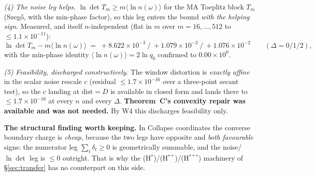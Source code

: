 \documentclass[11pt]{article}
\theoremstyle{definition}
\theoremstyle{remark}
\begin{document}
\emph{(4) The noise leg helps.} $\ln\det T_m\ge m\langle\ln n(\omega)\rangle$
for the MA Toeplitz block $T_m$ (Szeg\H o, with the min-phase factor), so this
leg enters the bound \emph{with the helping sign}. Measured, and itself
$n$-independent (flat in $m$ over $m=16,\dots,512$ to
$\le1.1\times10^{-11}$):
\[
\ln\det T_m-m\langle\ln n(\omega)\rangle
\;=\;+8.622\times10^{-3}\ /\ +1.079\times10^{-2}\ /\ +1.076\times10^{-2}
\qquad(\Delta=0/1/2),
\]
with the min-phase identity $\langle\ln n(\omega)\rangle=2\ln q_0$ confirmed
to $0.00\times10^{0}$.

\emph{(5) Feasibility, discharged constructively.} The window distortion is
\emph{exactly affine} in the scalar noise rescale $c$ (residual
$\le1.7\times10^{-16}$ over a three-point secant test), so the $c$ landing at
$\mathrm{dist}=D$ is available in closed form and lands there to
$\le1.7\times10^{-16}$ at every $n$ and every $\Delta$. \textbf{Theorem~C's
convexity repair was available and was not needed.} By W4 this discharges
feasibility only.

\medskip\noindent\textbf{The structural finding worth keeping.} In Collapse
coordinates the converse boundary charge is \emph{cheap}, because the two legs
have opposite and \emph{both favourable} signs: the numerator leg
$\sum_t\delta_t\ge0$ is geometrically summable, and the noise/$\ln\det$ leg is
$\le0$ outright. That is why the (H$^\ast$)/(H$^{\ast\ast}$)/(H$^{\ast\ast
\ast}$) machinery of \S\ref{sec:transfer} has no counterpart on this side.
\end{document}

